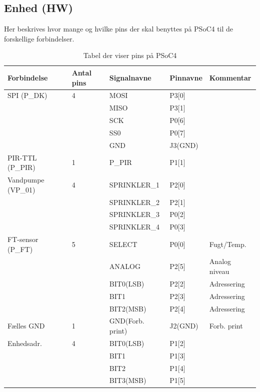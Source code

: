 \begin{table}[H]
\subsection{Enhed (HW)}
Her beskrives hvor mange og hvilke pins der skal benyttes på PSoC4 til de forskellige forbindelser.
\caption{Tabel der viser pins på PSoC4}
\begin{small}
\begin{tabular}{|p{}|p{2cm}|p{}|p{}|p{2.6cm}|}
\hline

\textbf{Forbindelse}	&\textbf{Antal pins} 	&\textbf{Signalnavne} &\textbf{Pinnavne} &\textbf{Kommentar}  \\ \hline

SPI 	(P\_DK)			&4 						&MOSI				&P3[0]		&					\\\cline{3-4}
					&						&MISO				&P3[1]		&					\\\cline{3-4}
					&						&SCK					&P0[6]		&					\\\cline{3-4}
					&						&SS0					&P0[7]		&					\\\cline{3-4}
					&						&GND					&J3(GND) 	&					\\\hline
	
PIR-TTL	(P\_PIR)		&1 						&P\_PIR				&P1[1] 		&					\\\hline

Vandpumpe (VP\_01)	&4 						&SPRINKLER\_1		&P2[0]		&					\\\cline{3-4}
					&						&SPRINKLER\_2		&P2[1]		&					\\\cline{3-4}
					&						&SPRINKLER\_3		&P0[2]		&					\\\cline{3-4}
					&						&SPRINKLER\_4		&P0[3]		&					\\\hline
		
FT-sensor (P\_FT)	&5						&SELECT				&P0[0]		&Fugt/Temp.			\\\cline{3-5}
					&						&ANALOG				&P2[5]		&Analog niveau		\\\cline{3-5}
					&						&BIT0(LSB)			&P2[2]		&Adressering			\\\cline{3-5}
					&						&BIT1				&P2[3]		&Adressering			\\\cline{3-5}
					&						&BIT2(MSB)			&P2[4]		&Adressering			\\\hline			
					
Fælles GND			&1 						&GND(Forb. print)	&J2(GND) 	&Forb. print			\\\hline					
					
Enhedsadr. 			&4 						&BIT0(LSB)			&P1[2]		&					\\\cline{3-4}
					&						&BIT1				&P1[3]		&					\\\cline{3-4}
					&						&BIT2				&P1[4]		&					\\\cline{3-4}
					&						&BIT3(MSB)			&P1[5]		&					\\\hline

\end{tabular}
\end{small}
\label{table:enhed_forbindelse}
\end{table}

